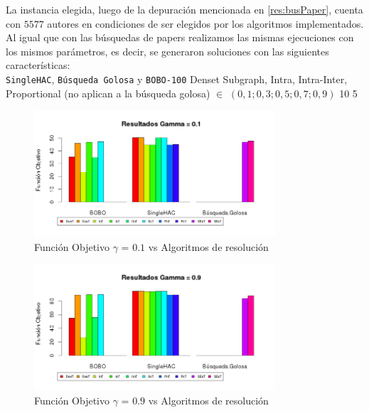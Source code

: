 La instancia elegida, luego de la depuración mencionada en \ref{res:busPaper}, cuenta con $5577$ autores en condiciones de ser elegidos por los algoritmos implementados.\\
Al igual que con las búsquedas de papers realizamos las mismas ejecuciones con los mismos parámetros, es decir, se generaron soluciones con las siguientes características:\\
\Solucion
{}
{\texttt{SingleHAC}, \texttt{Búsqueda Golosa} y \texttt{BOBO-100}}
{Denset Subgraph, Intra, Intra-Inter, Proportional (no aplican a la búsqueda golosa)}
{$\in$ $(0,1; 0,3; 0,5; 0,7; 0,9)$}
{10}
{5}

\begin{figure}[H]
  \centering
    \includegraphics[width=0.8\textwidth]{resultados/authors/Graficos_agrupados/gamma01-autores.png}
  \caption{Función Objetivo $\gamma$ = $0.1$ vs Algoritmos de resolución}
  \label{res:img-autores-agr-gamma01}
\end{figure}

\begin{figure}[H]
  \centering
    \includegraphics[width=0.8\textwidth]{resultados/authors/Graficos_agrupados/gamma09-autores.png}
  \caption{Función Objetivo $\gamma$ = $0.9$ vs Algoritmos de resolución}
  \label{res:img-autores-agr-gamma09}
\end{figure}

